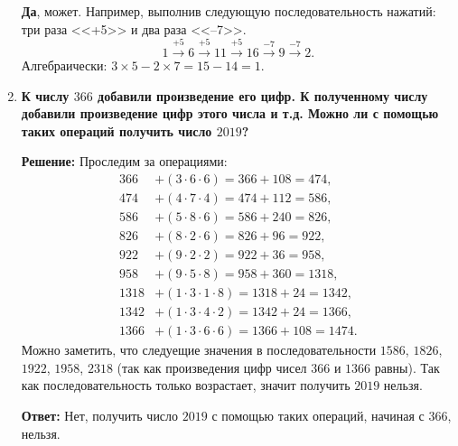 \documentclass[12pt, a4paper]{article}
\begin{document}
\begin{enumerate}[label=\arabic*., wide=0pt, leftmargin=*]
    \textbf{Да}, может. Например, выполнив следующую последовательность нажатий: три раза <<+5>> и два раза <<–7>>.
    \[
    1 \xrightarrow{+5} 6 \xrightarrow{+5} 11 \xrightarrow{+5} 16 \xrightarrow{-7} 9 \xrightarrow{-7} 2.
    \]
    Алгебраически: $3 \times 5 - 2 \times 7 = 15 - 14 = 1$.

    \item \textbf{К числу $366$ добавили произведение его цифр. К полученному числу добавили произведение цифр этого числа и т.д. Можно ли с помощью таких операций получить число $2019$?}

    \textbf{Решение:}
    Проследим за операциями:
    \begin{align*}
    366 &+ (3 \cdot 6 \cdot 6) = 366 + 108 = 474, \\
    474 &+ (4 \cdot 7 \cdot 4) = 474 + 112 = 586, \\
    586 &+ (5 \cdot 8 \cdot 6) = 586 + 240 = 826, \\
    826 &+ (8 \cdot 2 \cdot 6) = 826 + 96 = 922, \\
    922 &+ (9 \cdot 2 \cdot 2) = 922 + 36 = 958, \\
    958 &+ (9 \cdot 5 \cdot 8) = 958 + 360 = 1318, \\
    1318 &+ (1 \cdot 3 \cdot 1 \cdot 8) = 1318 + 24 = 1342, \\
    1342 &+ (1 \cdot 3 \cdot 4 \cdot 2) = 1342 + 24 = 1366, \\
    1366 &+ (1 \cdot 3 \cdot 6 \cdot 6) = 1366 + 108 = 1474.
    \end{align*}
    Можно заметить, что следуещие значения в последовательности $1586$, $1826$, $1922$, $1958$, $2318$ (так как произведения цифр чисел $366$ и $1366$ равны). Так как последовательность только возрастает, значит получить $2019$ нельзя.

    \textbf{Ответ:} Нет, получить число $2019$ с помощью таких операций, начиная с $366$, нельзя.
\end{enumerate}
\end{document}
